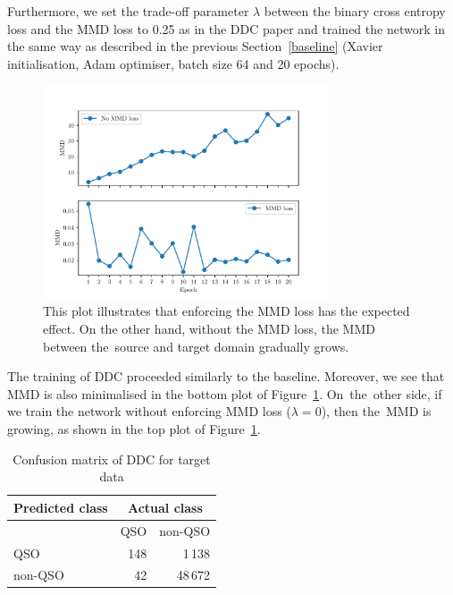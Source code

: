 Furthermore, we set the trade-off parameter \(\lambda\)
between the binary cross entropy loss
and the MMD loss to 0.25 as in the DDC paper
and trained the network in the same way as described in the previous Section~\ref{baseline}
(Xavier initialisation, Adam optimiser, batch size 64 and 20 epochs).

\begin{figure}
\begin{center}
\includegraphics[width=0.75\textwidth]{img/ddc_mmds.pdf}
\end{center}
\caption[Maximum mean discrepancy with and without MMD loss]{
	This plot illustrates that enforcing the MMD loss has the expected effect. On the other hand, without the MMD loss, the MMD between the~source and target domain gradually grows.
}
\label{ddc_mmds}
\end{figure}

The training of DDC proceeded similarly to the baseline.
Moreover, we see that MMD is also minimalised in the bottom plot of Figure~\ref{ddc_mmds}.
On~the~other side, if we train the network without enforcing MMD loss (\(\lambda = 0\)),
then the~MMD is growing, as shown in the top plot of Figure~\ref{ddc_mmds}.

\begin{table}
\begin{center}
\begin{tabular}{|l|r|r|}
	\hline
	Predicted class & \multicolumn{2}{c|}{Actual class} \\
	\hline \hline
	& QSO & non-QSO \\ \hline
	QSO & 148 & 1\,138 \\ \hline
	non-QSO & 42 & 48\,672 \\ \hline
\end{tabular}
\end{center}
\caption{Confusion matrix of DDC for target data}
\label{ddc_confusion}
\end{table}

